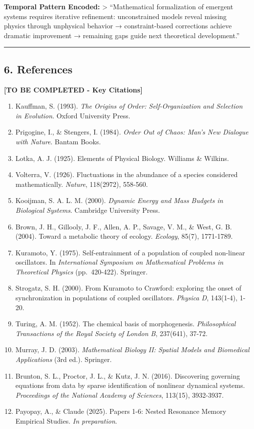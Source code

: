 \documentclass[
]{article}
\begin{document}
\textbf{Temporal Pattern Encoded:} \textgreater{} ``Mathematical
formalization of emergent systems requires iterative refinement:
unconstrained models reveal missing physics through unphysical behavior
→ constraint-based corrections achieve dramatic improvement → remaining
gaps guide next theoretical development.''

\begin{center}\rule{0.5\linewidth}{0.5pt}\end{center}

\subsection{6. References}\label{references}

\textbf{{[}TO BE COMPLETED - Key Citations{]}}

\begin{enumerate}
\def\labelenumi{\arabic{enumi}.}
\item
  Kauffman, S. (1993). \emph{The Origins of Order: Self-Organization and
  Selection in Evolution}. Oxford University Press.
\item
  Prigogine, I., \& Stengers, I. (1984). \emph{Order Out of Chaos: Man's
  New Dialogue with Nature}. Bantam Books.
\item
  Lotka, A. J. (1925). Elements of Physical Biology. Williams \&
  Wilkins.
\item
  Volterra, V. (1926). Fluctuations in the abundance of a species
  considered mathematically. \emph{Nature}, 118(2972), 558-560.
\item
  Kooijman, S. A. L. M. (2000). \emph{Dynamic Energy and Mass Budgets in
  Biological Systems}. Cambridge University Press.
\item
  Brown, J. H., Gillooly, J. F., Allen, A. P., Savage, V. M., \& West,
  G. B. (2004). Toward a metabolic theory of ecology. \emph{Ecology},
  85(7), 1771-1789.
\item
  Kuramoto, Y. (1975). Self-entrainment of a population of coupled
  non-linear oscillators. In \emph{International Symposium on
  Mathematical Problems in Theoretical Physics} (pp.~420-422). Springer.
\item
  Strogatz, S. H. (2000). From Kuramoto to Crawford: exploring the onset
  of synchronization in populations of coupled oscillators.
  \emph{Physica D}, 143(1-4), 1-20.
\item
  Turing, A. M. (1952). The chemical basis of morphogenesis.
  \emph{Philosophical Transactions of the Royal Society of London B},
  237(641), 37-72.
\item
  Murray, J. D. (2003). \emph{Mathematical Biology II: Spatial Models
  and Biomedical Applications} (3rd ed.). Springer.
\item
  Brunton, S. L., Proctor, J. L., \& Kutz, J. N. (2016). Discovering
  governing equations from data by sparse identification of nonlinear
  dynamical systems. \emph{Proceedings of the National Academy of
  Sciences}, 113(15), 3932-3937.
\item
  Payopay, A., \& Claude (2025). Papers 1-6: Nested Resonance Memory
  Empirical Studies. \emph{In preparation}.
\end{enumerate}
\end{document}
